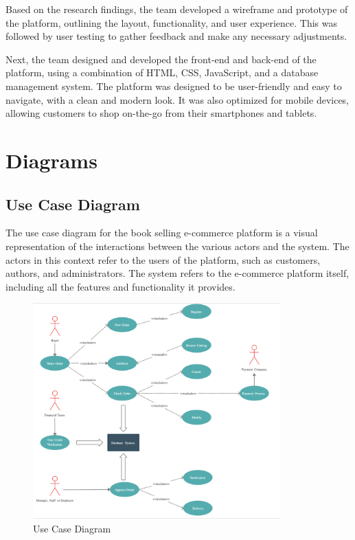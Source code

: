 \documentclass[12pt]{article}
\begin{document}
Based on the research findings, the team developed a wireframe and prototype of the platform, outlining the layout, functionality, and user experience. This was followed by user testing to gather feedback and make any necessary adjustments.

Next, the team designed and developed the front-end and back-end of the platform, using a combination of HTML, CSS, JavaScript, and a database management system. The platform was designed to be user-friendly and easy to navigate, with a clean and modern look. It was also optimized for mobile devices, allowing customers to shop on-the-go from their smartphones and tablets.

\newpage
\section{Diagrams}

\subsection{Use Case Diagram}

The use case diagram for the book selling e-commerce platform is a visual representation of the interactions between the various actors and the system. The actors in this context refer to the users of the platform, such as customers, authors, and administrators. The system refers to the e-commerce platform itself, including all the features and functionality it provides.

\begin{figure}[h]
\centering
\includegraphics[width=0.85\textwidth]{use_case_diagram.png}
\caption{Use Case Diagram}
\end{figure}
\end{document}
